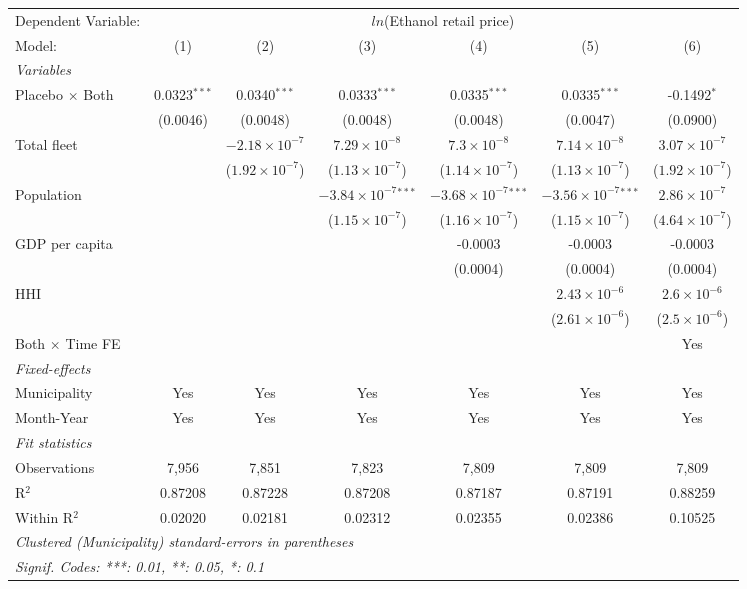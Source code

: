 \documentclass[
]{article}
\begin{document}
\begin{tabular}{lcccccc}
\tabularnewline\midrule\midrule
Dependent Variable:&\multicolumn{6}{c}{$ln$(Ethanol retail price)}\\
Model:&(1) & (2) & (3) & (4) & (5) & (6)\\
\midrule \emph{Variables}&   &   &   &   &   &  \\
Placebo $\times $ Both & 0.0323$^{***}$ & 0.0340$^{***}$ & 0.0333$^{***}$ & 0.0335$^{***}$ & 0.0335$^{***}$ & -0.1492$^{*}$\\
  &(0.0046) & (0.0048) & (0.0048) & (0.0048) & (0.0047) & (0.0900)\\
Total fleet &    & $-2.18\times 10^{-7}$ & $7.29\times 10^{-8}$ & $7.3\times 10^{-8}$ & $7.14\times 10^{-8}$ & $3.07\times 10^{-7}$\\
  &   & ($1.92\times 10^{-7}$) & ($1.13\times 10^{-7}$) & ($1.14\times 10^{-7}$) & ($1.13\times 10^{-7}$) & ($1.92\times 10^{-7}$)\\
Population &    &    & $-3.84\times 10^{-7}$$^{***}$ & $-3.68\times 10^{-7}$$^{***}$ & $-3.56\times 10^{-7}$$^{***}$ & $2.86\times 10^{-7}$\\
  &   &    & ($1.15\times 10^{-7}$) & ($1.16\times 10^{-7}$) & ($1.15\times 10^{-7}$) & ($4.64\times 10^{-7}$)\\
GDP per capita &    &    &    & -0.0003 & -0.0003 & -0.0003\\
  &   &    &    & (0.0004) & (0.0004) & (0.0004)\\
HHI &    &    &    &    & $2.43\times 10^{-6}$ & $2.6\times 10^{-6}$\\
  &   &    &    &    & ($2.61\times 10^{-6}$) & ($2.5\times 10^{-6}$)\\
Both $\times$ Time FE &  &  &  &  &  & Yes\\
\midrule \emph{Fixed-effects}&   &   &   &   &   &  \\
Municipality & Yes & Yes & Yes & Yes & Yes & Yes\\
Month-Year & Yes & Yes & Yes & Yes & Yes & Yes\\
\midrule \emph{Fit statistics}&  & & & & & \\
Observations & 7,956&7,851&7,823&7,809&7,809&7,809\\
R$^2$ & 0.87208&0.87228&0.87208&0.87187&0.87191&0.88259\\
Within R$^2$ & 0.02020&0.02181&0.02312&0.02355&0.02386&0.10525\\
\midrule\midrule\multicolumn{7}{l}{\emph{Clustered (Municipality) standard-errors in parentheses}}\\
\multicolumn{7}{l}{\emph{Signif. Codes: ***: 0.01, **: 0.05, *: 0.1}}\\
\end{tabular}
\end{document}

